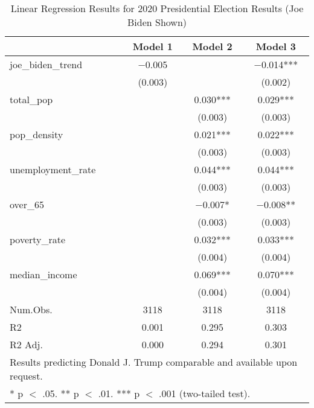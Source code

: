 \begin{table}[!h]

\caption{\label{tab:pres_2020_analysis}Linear Regression Results for 2020 Presidential Election Results (Joe Biden Shown)}
\centering
\fontsize{8}{10}\selectfont

\begin{tabular}{lccc}
\toprule
  & Model 1 & Model 2 & Model 3\\
\midrule

joe\_biden\_trend & \num{-0.005} &  & \num{-0.014}***\\
 & (\num{0.003}) &  & (\num{0.002})\\
total\_pop &  & \num{0.030}*** & \num{0.029}***\\
 &  & (\num{0.003}) & \vphantom{3} (\num{0.003})\\
pop\_density &  & \num{0.021}*** & \num{0.022}***\\
 &  & (\num{0.003}) & \vphantom{2} (\num{0.003})\\
unemployment\_rate &  & \num{0.044}*** & \num{0.044}***\\
 &  & (\num{0.003}) & \vphantom{1} (\num{0.003})\\
over\_65 &  & \num{-0.007}* & \num{-0.008}**\\
 &  & (\num{0.003}) & (\num{0.003})\\
poverty\_rate &  & \num{0.032}*** & \num{0.033}***\\
 &  & (\num{0.004}) & \vphantom{1} (\num{0.004})\\
median\_income &  & \num{0.069}*** & \num{0.070}***\\
 &  & (\num{0.004}) & (\num{0.004})\\
\midrule
Num.Obs. & \num{3118} & \num{3118} & \num{3118}\\
R2 & \num{0.001} & \num{0.295} & \num{0.303}\\
R2 Adj. & \num{0.000} & \num{0.294} & \num{0.301}\\
\bottomrule
\multicolumn{4}{l}{\rule{0pt}{1em}Results predicting Donald J. Trump comparable and available upon request.}\\
\multicolumn{4}{l}{\rule{0pt}{1em}* p $<$ .05. ** p $<$ .01. *** p $<$ .001 (two-tailed test).}\\
\end{tabular}
\end{table}